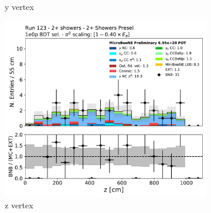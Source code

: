 \begin{figure}[H]
\begin{subfigure}{0.3\textwidth}
    \caption{y vertex}
    \end{subfigure}
    \begin{subfigure}{0.3\textwidth}
    \includegraphics[width=1.0\textwidth]{Sidebands/Figures/TwoShr_1e0pSel/BDT/reco_nu_vtx_z.pdf}
    \caption{z vertex}
    \end{subfigure}
    \caption{} 
    \label{fig:HE_1eNp_1}
\end{figure}

